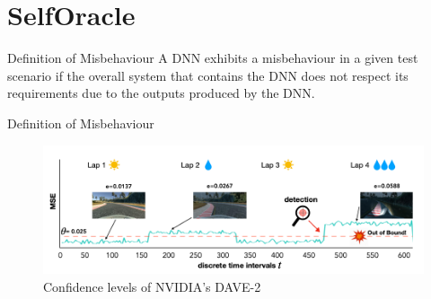 \documentclass[aspectratio=1610,17pt,utf8]{beamer}
\begin{document}
\section{SelfOracle}

\begin{frame}{Definition of Misbehaviour}
A DNN exhibits a misbehaviour in a given test scenario if the overall system that contains the DNN does not respect its requirements due to the outputs produced by the DNN.
\end{frame}

\begin{frame}{Definition of Misbehaviour}
  \begin{figure}[!htb]
   	\centering
   	\includegraphics[width=1\linewidth]{fig02.png}
    \caption{Confidence levels of NVIDIA’s DAVE-2}
    \label{Fig:Data3}
  \end{figure}

\end{frame}
\end{document}
